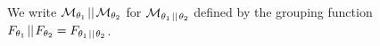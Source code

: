 \documentclass[preview]{standalone}
\begin{document}
We write $\view[\viewppty_1] \pll \view[\viewppty_2]$ for $\view[\viewppty_1 \pll \viewppty_2]$ defined by the grouping function \grpfctN $\grpfct[\viewppty_1] \pll \grpfct[\viewppty_2] = \grpfct[\viewppty_1 \pll \viewppty_2]$.



%
\end{document}
